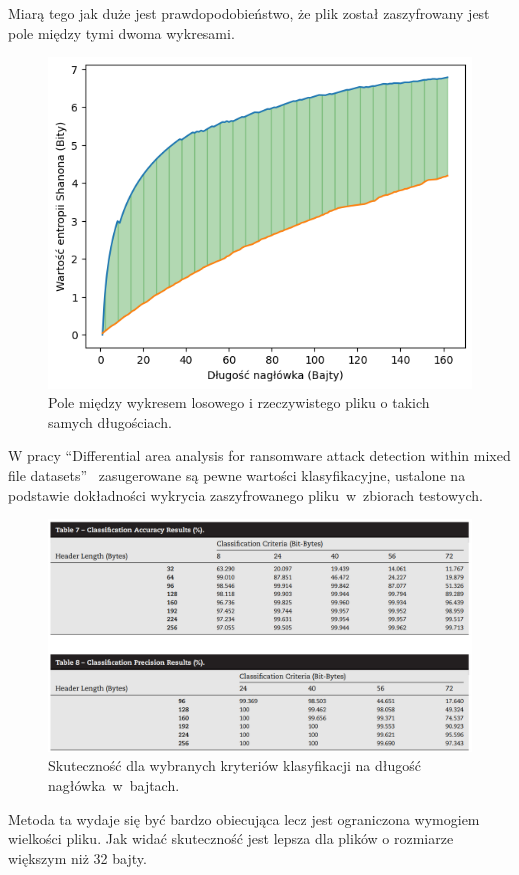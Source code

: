 Miarą tego jak duże jest prawdopodobieństwo, że plik został zaszyfrowany jest pole między tymi dwoma wykresami.
\begin{figure}[H]
    \centering
    \includegraphics[width=0.7\linewidth]{rysunki/pole.png}
    \caption{Pole między wykresem losowego i rzeczywistego pliku o takich samych długościach.}
    \label{fig:enter-label}
\end{figure}
W pracy \foreignquote{english}{Differential area analysis for ransomware
attack detection within mixed file datasets}~\cite{davies_differential_2021} zasugerowane są pewne wartości klasyfikacyjne, ustalone na podstawie
dokładności wykrycia zaszyfrowanego pliku~w~zbiorach testowych.
\begin{figure}[H]
    \centering
    \includegraphics[width=0.85\linewidth]{rysunki/wycinek.png}
    \caption{Skuteczność dla wybranych kryteriów klasyfikacji na długość nagłówka~w~bajtach\protect\footnotemark.}
    \label{fig:enter-label}
\end{figure}

Metoda ta wydaje się być bardzo obiecująca lecz jest ograniczona wymogiem wielkości pliku. Jak widać skuteczność jest lepsza dla plików o rozmiarze większym niż 32 bajty.
